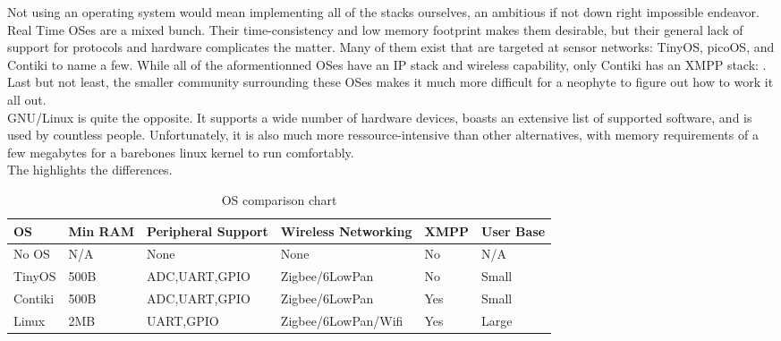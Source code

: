 Not using an operating system would mean implementing all of the stacks ourselves, an ambitious if not down right impossible endeavor.\\

Real Time OSes are a mixed bunch. Their time-consistency and low memory footprint makes them desirable, but their general lack of support for protocols and hardware complicates the matter. Many of them exist that are targeted at sensor networks: TinyOS, picoOS, and Contiki to name a few. While all of the aformentionned OSes have an IP stack and wireless capability, only Contiki has an XMPP stack: \uxmpp . Last but not least, the smaller community surrounding these OSes makes it much more difficult for a neophyte to figure out how to work it all out.\\

GNU/Linux is quite the opposite. It supports a wide number of hardware devices, boasts an extensive list of supported software, and is used by countless people. Unfortunately, it is also much more ressource-intensive than other alternatives, with memory requirements of a few megabytes for a barebones linux kernel to run comfortably.\\

The  highlights the differences.

\begin{table}[H]
\begin{changemargin}{-1cm}{-1cm}
\begin{center}
\begin{tabular}{|l|l|l|l|l|l|}
\hline
\textbf{OS} & \textbf{Min RAM} & \textbf{Peripheral Support} & \textbf{Wireless Networking} & \textbf{XMPP} & \textbf{User Base} \\
\hline \hline
No OS & N/A & None & None & No & N/A\\
\hline
TinyOS & 500B & ADC,UART,GPIO & Zigbee/6LowPan & No & Small\\
\hline
Contiki & 500B & ADC,UART,GPIO & Zigbee/6LowPan & Yes & Small\\
\hline
Linux & 2MB & UART,GPIO & Zigbee/6LowPan/Wifi & Yes & Large\\
\hline
\end{tabular}
\caption{OS comparison chart}\label{tab:operatingsystems}
\end{center}
\end{changemargin}
\end{table}

